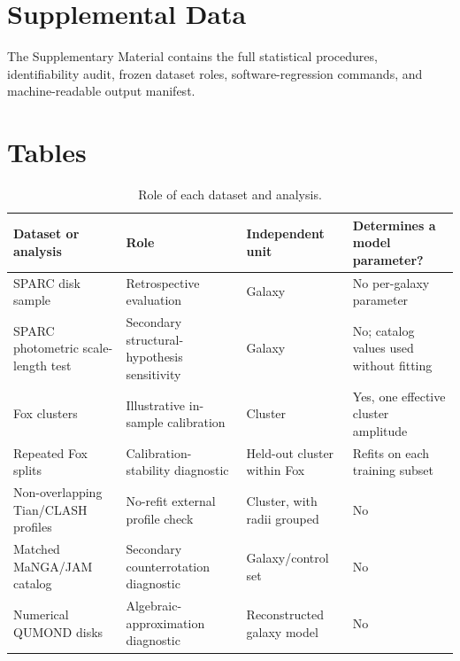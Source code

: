 \documentclass[utf8]{FrontiersinHarvard}
\begin{document}
\section*{Supplemental Data}

The Supplementary Material contains the full statistical procedures, identifiability audit, frozen dataset roles, software-regression commands, and machine-readable output manifest.




\section*{Tables}

\begin{table}[h!]
\centering
\caption{Role of each dataset and analysis.}\label{tab:roles}
\scriptsize
\begin{tabularx}{\textwidth}{>{\raggedright\arraybackslash}p{}>{\raggedright\arraybackslash}p{}>{\raggedright\arraybackslash}p{}>{\raggedright\arraybackslash}X}
\toprule
Dataset or analysis & Role & Independent unit & Determines a model parameter? \\
\midrule
SPARC disk sample & Retrospective evaluation & Galaxy & No per-galaxy parameter \\
SPARC photometric scale-length test & Secondary structural-hypothesis sensitivity & Galaxy & No; catalog values used without fitting \\
Fox clusters & Illustrative in-sample calibration & Cluster & Yes, one effective cluster amplitude \\
Repeated Fox splits & Calibration-stability diagnostic & Held-out cluster within Fox & Refits on each training subset \\
Non-overlapping Tian/CLASH profiles & No-refit external profile check & Cluster, with radii grouped & No \\
Matched MaNGA/JAM catalog & Secondary counterrotation diagnostic & Galaxy/control set & No \\
Numerical QUMOND disks & Algebraic-approximation diagnostic & Reconstructed galaxy model & No \\
\bottomrule
\end{tabularx}
\end{table}
\end{document}
